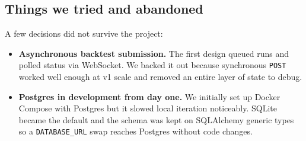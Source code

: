 \subsection*{Things we tried and abandoned}

A few decisions did not survive the project:

\begin{itemize}
  \item \textbf{Asynchronous backtest submission.} The first design queued runs and
        polled status via WebSocket. We backed it out because synchronous \texttt{POST}
        worked well enough at v1 scale and removed an entire layer of state to debug.
  \item \textbf{Postgres in development from day one.} We initially set up Docker
        Compose with Postgres but it slowed local iteration noticeably. SQLite became
        the default and the schema was kept on SQLAlchemy generic types so a
        \texttt{DATABASE\_URL} swap reaches Postgres without code changes.
\end{itemize}
